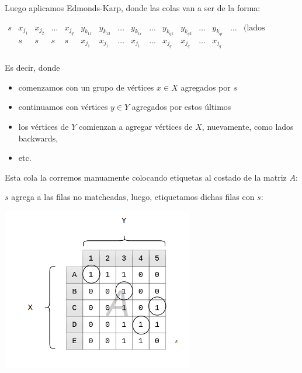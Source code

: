 \documentclass[10pt,a4paper]{article}
\begin{document}
Luego aplicamos Edmonds-Karp, donde las colas van a ser de la forma:

\begin{center}
$\begin{array}{c|cccc|cccc|c|cccc|cc} s & x_{j_1} & x_{j_2} & \dots & x_{j_q} &y_{k_{11}}&y_{k_{12}} &\dots &y_{k_{1r}} &\dots&y_{k_{q1}}&y_{k_{q2}} &\dots &y_{k_{qr}} & \dots &\text{(lados backwards)}\\ & s & s & s & s & x_{j_1} & x_{j_1} &\dots & x_{j_1} &\dots& x_{j_q} & x_{j_q} &\dots & x_{j_q} & \\ \end{array}$
\end{center}

Es decir, donde

\begin{itemize}

	\item comenzamos con un grupo de vértices $x \in X$ agregados por $s$
	\item continuamos con vértices $y \in Y$ agregados por estos últimos
	\item los vértices de $Y$ comienzan a agregar vértices de $X$, nuevamente, como lados backwards,
	\item etc.
\end{itemize}

Esta cola la corremos manuamente colocando etiquetas al costado de la matriz $A$:

$s$ agrega a las filas no matcheadas, luego, etiquetamos dichas filas con $s$:

\begin{center}

    \begin{adjustbox}{max size={\textwidth}{\textheight}}
        \includegraphics{definitions/matching_8.jpg}
        \end{adjustbox}
    
\end{center}
\end{document}
